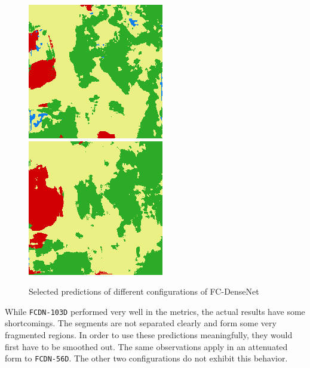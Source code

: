 \begin{figure}
    \includegraphics[width=\DensenetPredictionsImageWidth]{images/densenet/densenet-67D/768909-prediction} \hfill
    \includegraphics[width=\DensenetPredictionsImageWidth]{images/densenet/densenet-56D/768909-prediction}

    \caption{Selected predictions of different configurations of FC-DenseNet}
    \label{fig:densenet_prediction_images}
\end{figure}

While \texttt{FCDN-103D} performed very well in the metrics, the actual results have some shortcomings. The segments are not separated clearly and form some very fragmented regions. In order to use these predictions meaningfully, they would first have to be smoothed out. The same observations apply in an attenuated form to \texttt{FCDN-56D}. The  other two configurations do not exhibit this behavior.

